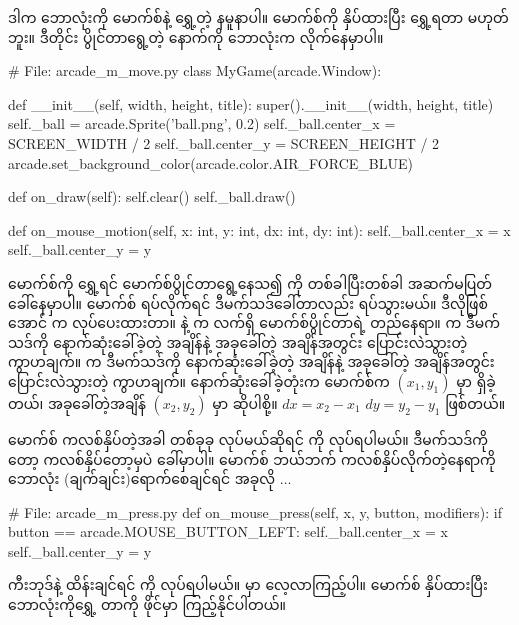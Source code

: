 ဒါက ဘောလုံးကို မောက်စ်နဲ့ ရွှေ့တဲ့ နမူနာပါ။ မောက်စ်ကို နှိပ်ထားပြီး ရွှေ့ရတာ  မဟုတ်ဘူး။ ဒီတိုင်း ပွိုင်တာရွေ့တဲ့ နောက်ကို ဘောလုံးက လိုက်နေမှာပါ။
%
\begin{py}
# File: arcade_m_move.py
class MyGame(arcade.Window):

    def __init__(self, width, height, title):
        super().__init__(width, height, title)
        self._ball = arcade.Sprite('ball.png', 0.2)
        self._ball.center_x = SCREEN_WIDTH / 2
        self._ball.center_y = SCREEN_HEIGHT / 2
        arcade.set_background_color(arcade.color.AIR_FORCE_BLUE)

    def on_draw(self):
        self.clear()
        self._ball.draw()

    def on_mouse_motion(self, x: int, y: int, dx: int, dy: int):
        self._ball.center_x = x
        self._ball.center_y = y
\end{py}
%
မောက်စ်ကို ရွှေ့ရင် မောက်စ်ပွိုင်တာရွေ့နေသ၍  ကို တစ်ခါပြီးတစ်ခါ အဆက်မပြတ် ခေါ်နေမှာပါ။ မောက်စ် ရပ်လိုက်ရင် ဒီမက်သဒ်ခေါ်တာလည်း ရပ်သွားမယ်။ ဒီလိုဖြစ်အောင်  က လုပ်ပေးထားတာ။  နဲ့  က လက်ရှိ မောက်စ်ပွိုင်တာရဲ့ တည်နေရာ။  က ဒီမက်သဒ်ကို နောက်ဆုံးခေါ်ခဲ့တဲ့ အချိန်နဲ့ အခုခေါ်တဲ့ အချိန်အတွင်း ပြောင်းလဲသွားတဲ့  ကွာဟချက်။  က ဒီမက်သဒ်ကို နောက်ဆုံးခေါ်ခဲ့တဲ့ အချိန်နဲ့ အခုခေါ်တဲ့ အချိန်အတွင်း ပြောင်းလဲသွားတဲ့  ကွာဟချက်။ နောက်ဆုံးခေါ်ခဲ့တုံးက မောက်စ်က $(x_1, y_1)$ မှာ ရှိခဲ့တယ်၊ အခုခေါ်တဲ့အချိန် $(x_2, y_2)$ မှာ ဆိုပါစို့။  $dx= x_2 - x_1$\fEn{,} $dy= y_2 - y_1$ ဖြစ်တယ်။

မောက်စ် ကလစ်နှိပ်တဲ့အခါ တစ်ခုခု လုပ်မယ်ဆိုရင်  ကို  လုပ်ရပါမယ်။ ဒီမက်သဒ်ကိုတော့ ကလစ်နှိပ်တော့မှပဲ ခေါ်မှာပါ။  မောက်စ် ဘယ်ဘက် ကလစ်နှိပ်လိုက်တဲ့နေရာကို ဘောလုံး (ချက်ချင်း)ရောက်စေချင်ရင် အခုလို $\ldots$
%
\begin{py}
# File: arcade_m_press.py
def on_mouse_press(self, x, y, button, modifiers):
    if button == arcade.MOUSE_BUTTON_LEFT:
        self._ball.center_x = x
        self._ball.center_y = y
\end{py}
%

ကီးဘုဒ်နဲ့ ထိန်းချင်ရင်  ကို  လုပ်ရပါမယ်။  မှာ လေ့လာကြည့်ပါ။ မောက်စ် နှိပ်ထားပြီး ဘောလုံးကိုရွှေ့  တာကို  ဖိုင်မှာ ကြည့်နိုင်ပါတယ်။


